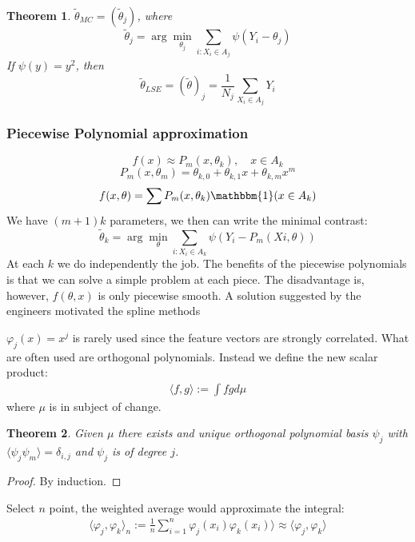 \documentclass[a4paper,12pt, oneside, fleqn]{book}
\newtheorem{theorem}{Theorem}[section]
\theoremstyle{definition}
\theoremstyle{remark}
\begin{document}
\begin{theorem}
	$\tilde{\theta}_{MC} = (\tilde{\theta}_j)$, where
	\begin{equation*}
		\tilde{\theta}_j = \arg \min_{\theta_j} \sum_{i: X_i \in A_j} \psi(Y_i - \theta_j)
	\end{equation*}
	If $\psi(y) = y^2$, then
	\begin{equation*}
		\tilde{\theta}_{LSE} = (\tilde{\theta})_j = \frac{1}{N_j} \sum_{X_i \in A_j} Y_i
	\end{equation*} 
\end{theorem}

\subsubsection*{Piecewise Polynomial approximation}
\begin{equation*}
	f(x) \approx P_m (x, \theta_k), \quad x \in A_k
\end{equation*}
\begin{equation*}
	P_m(x, \theta_m) = \theta_{k,0} + \theta_{k,1}x + \theta_{k,m} x^m
\end{equation*}
\begin{equation*}
	f(x, \theta) = \sum P_m(x, \theta_k) \mathbbm{1}(x \in A_k)
\end{equation*}
We have $(m+1)k$ parameters, we then can write the minimal contrast:
\begin{equation*}
	\tilde{\theta}_k = \arg \min_\theta \sum_{i: X_i \in A_k} \psi(Y_i - P_m(Xi, \theta))
\end{equation*}
At each $k$ we do independently the job. The benefits of the piecewise polynomials is that we can solve a simple problem at each piece. The disadvantage is, however, $f(\theta, x)$ is only piecewise smooth. A solution suggested by the engineers motivated the spline methods

$\varphi_j (x) = x^j$ is rarely used since the feature vectors are strongly correlated. What are often used are orthogonal polynomials. Instead we define the new scalar product:
\begin{align*}
	\langle f, g \rangle := \int f g d\mu 
\end{align*}
where $\mu$ is in subject of change. 

\begin{theorem}
	Given $\mu$ there exists and unique orthogonal polynomial basis $\psi_j$ with $\langle \psi_j \psi_m \rangle = \delta_{i, j}$ and $\psi_j$ is of degree $j$.
\end{theorem}
\begin{proof}
	 By induction.
\end{proof}
Select $n$ point, the weighted average would approximate the integral:
\begin{align*}
	\langle \varphi_j, \varphi_k \rangle_n:= \frac{1}{n}\sum_{i = 1}^n \varphi_j(x_i) \varphi_k(x_i)\rangle \approx \langle \varphi_j , \varphi_k \rangle
\end{align*}
\end{document}
